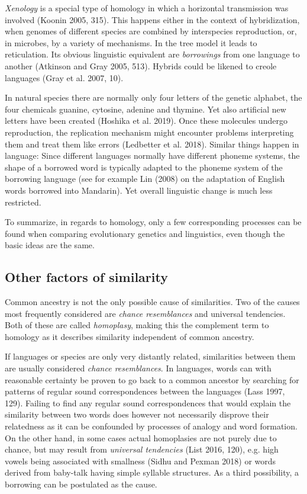 \documentclass[
  a4paper,
  14pt,
  oneside,
  tablecaptionabove
]{scrbook}
\begin{document}
\emph{Xenology} is a special type of homology in which a horizontal transmission was 
involved (Koonin 2005, 315). This happens either in the context of 
hybridization, when genomes of different species are combined by interspecies 
reproduction, or, in microbes, by a variety of mechanisms. In the tree model 
it leads to reticulation. Its obvious linguistic equivalent are \emph{borrowings} 
from one language to another (Atkinson and Gray 2005, 513). Hybrids could 
be likened to creole languages (Gray et al. 2007, 10).



In natural species there are normally only four letters of the genetic alphabet,
the four chemicals guanine, cytosine, adenine and thymine. Yet also artificial 
new letters have been created (Hoshika et al. 2019). Once these molecules 
undergo reproduction, the replication mechanism might encounter problems 
interpreting them and treat them like errors (Ledbetter et al. 2018). Similar 
things happen in language: Since different languages normally have different 
phoneme systems, the shape of a borrowed word is typically adapted to the 
phoneme system of the borrowing language (see for example Lin (2008) on the 
adaptation of English words borrowed into Mandarin). Yet overall linguistic 
change is much less restricted.

To summarize, in regards to homology, only a few corresponding processes can 
be found when comparing evolutionary genetics and linguistics, even though the 
basic ideas are the same.

\subsection*{Other factors of similarity}

Common ancestry is not the only possible cause of similarities. Two of the 
causes most frequently considered are \emph{chance resemblances} 
and universal tendencies. Both of these are called \emph{homoplasy},
making this the complement term to homology as it describes similarity 
independent of common ancestry.

If languages or species are only very distantly related, similarities between 
them are usually considered \emph{chance resemblances}. In languages, words can with 
reasonable certainty be proven to go back to a common ancestor by searching 
for patterns of regular sound correspondences between the languages 
(Lass 1997, 129). Failing to find any regular sound correspondences that 
would explain the similarity between two words does however not necessarily 
disprove their relatedness as it can be confounded by processes of analogy 
and word formation. On the other hand, in some cases actual homoplasies are 
not purely due to chance, but may result from \emph{universal tendencies} 
(List 2016, 120), e.g. high vowels being associated with smallness (Sidhu 
and Pexman 2018) or words derived from baby-talk having simple syllable 
structures. As a third possibility, a borrowing can be postulated as 
the cause.
\end{document}
